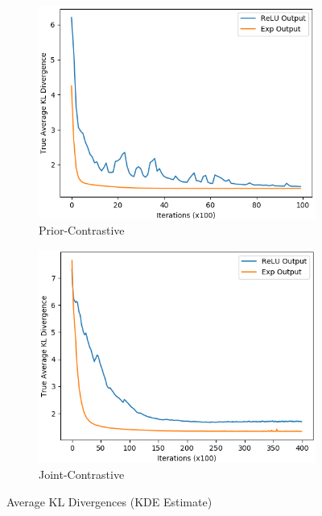 \documentclass[honours,12pt]{unswthesis}
\numberwithin{equation}{section}
\theoremstyle{definition}
\begin{document}
\begin{figure}[t!]
\begin{subfigure}{0.49\textwidth}
\includegraphics[width=\linewidth]{truklmins/PCKLvsPCKLEXP.png}
\caption{Prior-Contrastive}
\end{subfigure}
\begin{subfigure}{0.49\textwidth}
\includegraphics[width=\linewidth]{truklmins/JCKLvsJCKLEXP.png}
\caption{Joint-Contrastive}
\end{subfigure}
\caption{Average KL Divergences (KDE Estimate)}
\end{figure}
\end{document}
